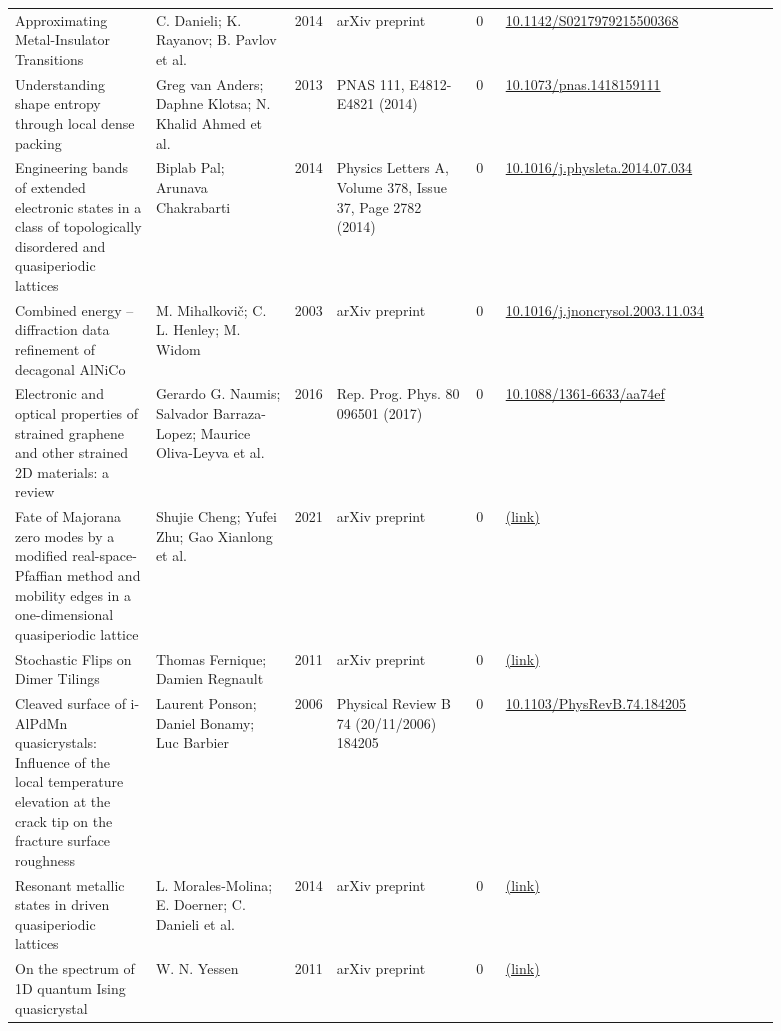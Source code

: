 \documentclass[10pt,a4paper]{article}
\begin{document}
{\begin{longtable}{p{0.192\linewidth}p{0.192\linewidth}p{0.043\linewidth}p{0.192\linewidth}p{0.043\linewidth}p{0.132\linewidth}p{0.096\linewidth}}
Approximating Metal-Insulator Transitions & C. Danieli; K. Rayanov; B. Pavlov et al. & 2014 & arXiv preprint & 0 & \href{https://doi.org/10.1142/S0217979215500368}{10.1142/S0217979215500368} &  \\
Understanding shape entropy through local dense packing & Greg van Anders; Daphne Klotsa; N. Khalid Ahmed et al. & 2013 & PNAS 111, E4812-E4821 (2014) & 0 & \href{https://doi.org/10.1073/pnas.1418159111}{10.1073/pnas.1418159111} &  \\
Engineering bands of extended electronic states in a class of topologically disordered and quasiperiodic lattices & Biplab Pal; Arunava Chakrabarti & 2014 & Physics Letters A, Volume 378, Issue 37, Page 2782 (2014) & 0 & \href{https://doi.org/10.1016/j.physleta.2014.07.034}{10.1016/j.physleta.2014.07.034} &  \\
Combined energy -- diffraction data refinement of decagonal AlNiCo & M. Mihalkovič; C. L. Henley; M. Widom & 2003 & arXiv preprint & 0 & \href{https://doi.org/10.1016/j.jnoncrysol.2003.11.034}{10.1016/j.jnoncrysol.2003.11.034} &  \\
Electronic and optical properties of strained graphene and other strained 2D materials: a review & Gerardo G. Naumis; Salvador Barraza-Lopez; Maurice Oliva-Leyva et al. & 2016 & Rep. Prog. Phys. 80 096501 (2017) & 0 & \href{https://doi.org/10.1088/1361-6633/aa74ef}{10.1088/1361-6633/aa74ef} &  \\
Fate of Majorana zero modes by a modified real-space-Pfaffian method and mobility edges in a one-dimensional quasiperiodic lattice & Shujie Cheng; Yufei Zhu; Gao Xianlong et al. & 2021 & arXiv preprint & 0 & \href{http://arxiv.org/abs/2102.00737v2}{(link)} &  \\
Stochastic Flips on Dimer Tilings & Thomas Fernique; Damien Regnault & 2011 & arXiv preprint & 0 & \href{http://arxiv.org/abs/1111.7297v1}{(link)} &  \\
Cleaved surface of i-AlPdMn quasicrystals: Influence of the local temperature elevation at the crack tip on the fracture surface roughness & Laurent Ponson; Daniel Bonamy; Luc Barbier & 2006 & Physical Review B 74 (20/11/2006) 184205 & 0 & \href{https://doi.org/10.1103/PhysRevB.74.184205}{10.1103/PhysRevB.74.184205} &  \\
Resonant metallic states in driven quasiperiodic lattices & L. Morales-Molina; E. Doerner; C. Danieli et al. & 2014 & arXiv preprint & 0 & \href{http://arxiv.org/abs/1405.0765v1}{(link)} &  \\
On the spectrum of 1D quantum Ising quasicrystal & W. N. Yessen & 2011 & arXiv preprint & 0 & \href{http://arxiv.org/abs/1110.6894v6}{(link)} &  \\

\end{longtable}}
\end{document}
